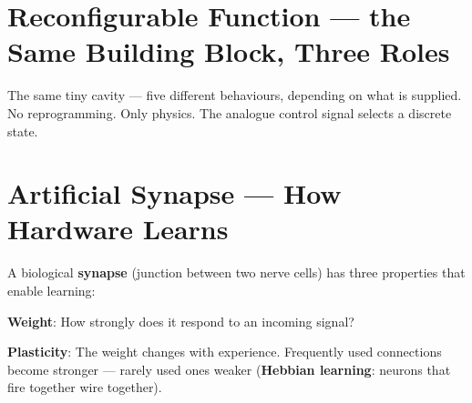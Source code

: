 \section{Reconfigurable Function --- the Same Building Block, Three Roles}
\label{sec:roles}

\begin{center}
\end{center}

The same tiny cavity --- five different behaviours,
depending on what is supplied. No reprogramming. Only physics.
The analogue control signal selects a discrete state.

\section{Artificial Synapse --- How Hardware Learns}
\label{sec:synapse}

A biological \textbf{synapse} (junction between
two nerve cells) has three properties that enable learning:

\textbf{Weight}: How strongly does it respond to an incoming signal?

\textbf{Plasticity}: The weight changes with experience.
Frequently used connections become stronger ---
rarely used ones weaker (\textbf{Hebbian learning}:
neurons that fire together wire together).

